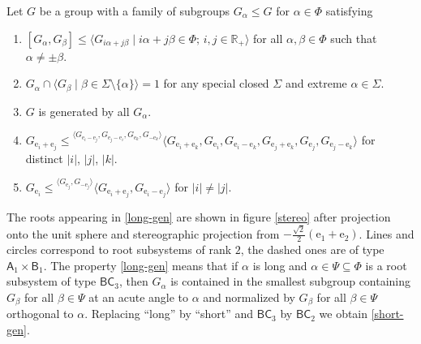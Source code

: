 \documentclass{article}
\theoremstyle{definition}
\newcommand{\up}[2]{{^{#1}\!{#2}}}
\begin{document}
Let \(G\) be a group with a family of subgroups \(G_\alpha \leq G\) for \(\alpha \in \Phi\) satisfying
\begin{enumerate}[label = {(C\arabic*)}]

    \item \label{comm-rel} \(
        [G_\alpha, G_\beta] \leq \langle
            G_{i \alpha + j \beta} \mid
            i \alpha + j \beta \in \Phi;\,
            i, j \in \mathbb R_+
        \rangle
    \) for all \(\alpha, \beta \in \Phi\) such that \(\alpha \neq \pm \beta\).

    \item \label{non-deg} \(
        G_\alpha \cap \langle
            G_\beta \mid
            \beta \in \Sigma \setminus \{\alpha\}
        \rangle = 1
    \) for any special closed \(\Sigma\) and extreme \(\alpha \in \Sigma\).

    \item \label{elementary} \(G\) is generated by all \(G_\alpha\).

    \item \label{long-gen} \(
        G_{\mathrm e_i + \mathrm e_j} \leq
        \up{\langle
            G_{\mathrm e_i - \mathrm e_j},
            G_{\mathrm e_j - \mathrm e_i},
            G_{\mathrm e_k},
            G_{-\mathrm e_k}
        \rangle}{\langle
            G_{\mathrm e_i + \mathrm e_k},
            G_{\mathrm e_i},
            G_{\mathrm e_i - \mathrm e_k},
            G_{\mathrm e_j + \mathrm e_k},
            G_{\mathrm e_j},
            G_{\mathrm e_j - \mathrm e_k}
        \rangle}
    \) for distinct \(|i|\), \(|j|\), \(|k|\).

    \item \label{short-gen} \(
        G_{\mathrm e_i} \leq \up{\langle
            G_{\mathrm e_j}, G_{-\mathrm e_j}
        \rangle}{\langle
            G_{\mathrm e_i + \mathrm e_j},
            G_{\mathrm e_i - \mathrm e_j}
        \rangle}
    \) for \(|i| \neq |j|\).

\end{enumerate}

The roots appearing in \ref{long-gen} are shown in figure \ref{stereo} after projection onto the unit sphere and stereographic projection from \(
    -\frac{\sqrt 2}2 (\mathrm e_1 + \mathrm e_2)
\). Lines and circles correspond to root subsystems of rank \(2\), the dashed ones are of type \(\mathsf A_1 \times \mathsf B_1\). The property \ref{long-gen} means that if \(\alpha\) is long and \(
    \alpha \in \Psi \subseteq \Phi
\) is a root subsystem of type \(\mathsf{BC}_3\), then \(G_\alpha\) is contained in the smallest subgroup containing \(G_\beta\) for all \(\beta \in \Psi\) at an acute angle to \(\alpha\) and normalized by \(G_\beta\) for all \(\beta \in \Psi\) orthogonal to \(\alpha\). Replacing ``long'' by ``short'' and \(\mathsf{BC}_3\) by \(\mathsf{BC}_2\) we obtain \ref{short-gen}.
\end{document}
